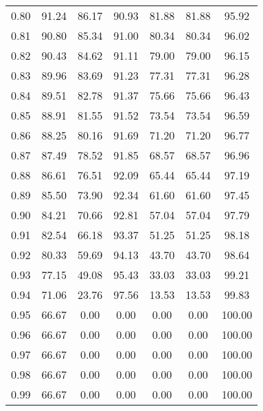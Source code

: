 \begin{tabular}{|c|c|c|c|c|c|c|}
      0.80 &     91.24 &     86.17 &      90.93 &   81.88 &      81.88 &         95.92 \\
      0.81 &     90.80 &     85.34 &      91.00 &   80.34 &      80.34 &         96.02 \\
      0.82 &     90.43 &     84.62 &      91.11 &   79.00 &      79.00 &         96.15 \\
      0.83 &     89.96 &     83.69 &      91.23 &   77.31 &      77.31 &         96.28 \\
      0.84 &     89.51 &     82.78 &      91.37 &   75.66 &      75.66 &         96.43 \\
      0.85 &     88.91 &     81.55 &      91.52 &   73.54 &      73.54 &         96.59 \\
      0.86 &     88.25 &     80.16 &      91.69 &   71.20 &      71.20 &         96.77 \\
      0.87 &     87.49 &     78.52 &      91.85 &   68.57 &      68.57 &         96.96 \\
      0.88 &     86.61 &     76.51 &      92.09 &   65.44 &      65.44 &         97.19 \\
      0.89 &     85.50 &     73.90 &      92.34 &   61.60 &      61.60 &         97.45 \\
      0.90 &     84.21 &     70.66 &      92.81 &   57.04 &      57.04 &         97.79 \\
      0.91 &     82.54 &     66.18 &      93.37 &   51.25 &      51.25 &         98.18 \\
      0.92 &     80.33 &     59.69 &      94.13 &   43.70 &      43.70 &         98.64 \\
      0.93 &     77.15 &     49.08 &      95.43 &   33.03 &      33.03 &         99.21 \\
      0.94 &     71.06 &     23.76 &      97.56 &   13.53 &      13.53 &         99.83 \\
      0.95 &     66.67 &      0.00 &       0.00 &    0.00 &       0.00 &        100.00 \\
      0.96 &     66.67 &      0.00 &       0.00 &    0.00 &       0.00 &        100.00 \\
      0.97 &     66.67 &      0.00 &       0.00 &    0.00 &       0.00 &        100.00 \\
      0.98 &     66.67 &      0.00 &       0.00 &    0.00 &       0.00 &        100.00 \\
      0.99 &     66.67 &      0.00 &       0.00 &    0.00 &       0.00 &        100.00 \\
\bottomrule
\end{tabular}
